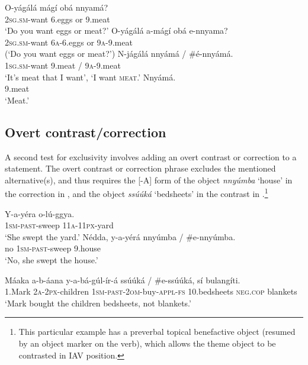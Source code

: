 \documentclass[output=paper]{langsci/langscibook}
\begin{document}
\ea\label{ex:vanderwal:26}
\ea\label{ex:vanderwal:26a}
\gll    O-yágálá    mágí    obá  nnyamá?\\
         \textsc{2sg}.\textsc{sm}-want    6.eggs    or  9.meat \\
\glt     ‘Do you want eggs or meat?’
\ex\label{ex:vanderwal:26b}
\gll    *O-yágálá    a-mágí  obá  e-nnyama?\\
         \textsc{2sg}.\textsc{sm}-want    \textsc{6a}-6.eggs  or  \textsc{9a}-9.meat\\
\glt     (‘Do you want eggs or meat?’)
\ex\label{ex:vanderwal:26c}
\gll      N-jágálá    nnyámá / \#é-nnyámá.\\
         \textsc{1sg}.\textsc{sm}-want    9.meat / \textsc{9a}-9.meat\\
\glt     ‘It’s meat that I want’, ‘I want \textsc{meat}.’
\ex\label{ex:vanderwal:26d}
\gll     Nnyámá.\\
         9.meat\\
\glt     ‘Meat.’
\z
\z

\subsection{Overt contrast/correction}\label{sec:vanderwal:4.2} %

A second test for exclusivity involves adding an overt contrast or correction to a statement. The overt contrast or correction phrase excludes the mentioned alternative(s), and thus requires the [-A] form of the object \textit{nnyúmba} ‘house’ in the correction in , and the object \textit{ssúúká} ‘bedsheets’ in the contrast in .\footnote{This particular example has a preverbal topical benefactive object (resumed by an object marker on the verb), which allows the theme object to be contrasted in IAV position.}

\ea\label{ex:vanderwal:27}
\ea\label{ex:vanderwal:27a}
\gll      Y-a-yéra    o-lú-ggya.\\
         \textsc{1sm}-\textsc{past}-sweep  \textsc{11a}-\textsc{11px}-yard\\
\glt     ‘She swept the yard.’
\ex\label{ex:vanderwal:27b}
\gll     Nédda,  y-a-yérá    nnyúmba / \#e-nnyúmba.\\
         no    \textsc{1sm}-\textsc{past}-sweep 9.house\\
\glt     ‘No, she swept the house.’
\z
\z

\ea\label{ex:vanderwal:28}
\gll   Máaka  a-b-áana    y-a-bá-gúl-ír-á        {ssúúká / \#e-ssúúká},  sí    bulangíti. \\
       1.Mark  \textsc{2a}-\textsc{2px}-children  \textsc{1sm}-\textsc{past}-\textsc{2om}-buy-\textsc{appl}-\textsc{fs}  10.bedsheets     \textsc{neg}.\textsc{cop}  blankets\\
\glt    ‘Mark bought the children bedsheets, not blankets.’
\z
\end{document}
